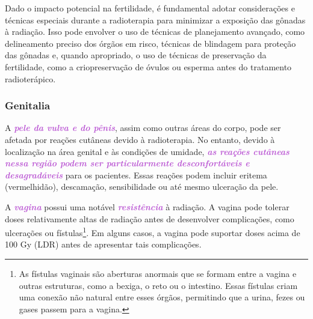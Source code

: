 \documentclass[11pt,a4paper]{article}
\begin{document}
	Dado o impacto potencial na fertilidade, é fundamental adotar considerações e técnicas especiais durante a radioterapia para minimizar a exposição das gônadas à radiação. Isso pode envolver o uso de técnicas de planejamento avançado, como delineamento preciso dos órgãos em risco, técnicas de blindagem para proteção das gônadas e, quando apropriado, o uso de técnicas de preservação da fertilidade, como a criopreservação de óvulos ou esperma antes do tratamento radioterápico.

\subsubsection*{Genitalia}
	
	A \textcolor{MediumOrchid}{\textbf{\textit{pele da vulva e do pênis}}}, assim como outras áreas do corpo, pode ser afetada por reações cutâneas devido à radioterapia. No entanto, devido à localização na área genital e às condições de umidade, \textcolor{MediumOrchid}{\textbf{\textit{as reações cutâneas nessa região podem ser particularmente desconfortáveis e desagradáveis}}} para os pacientes. Essas reações podem incluir eritema (vermelhidão), descamação, sensibilidade ou até mesmo ulceração da pele. 

	A \textcolor{MediumOrchid}{\textbf{\textit{vagina}}} possui uma notável \textcolor{MediumOrchid}{\textbf{\textit{resistência}}} à radiação. A vagina pode tolerar doses relativamente altas de radiação antes de desenvolver complicações, como ulcerações ou fístulas\footnote{As fístulas vaginais são aberturas anormais que se formam entre a vagina e outras estruturas, como a bexiga, o reto ou o intestino. Essas fístulas criam uma conexão não natural entre esses órgãos, permitindo que a urina, fezes ou gases passem para a vagina. }. Em alguns casos, a vagina pode suportar doses acima de 100 Gy (LDR) antes de apresentar tais complicações. 
\end{document}
